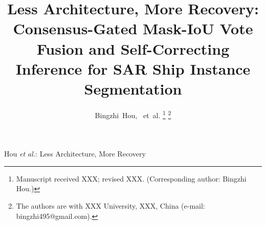 \documentclass[journal]{IEEEtran}
\begin{document}
\title{Less Architecture, More Recovery: Consensus-Gated Mask-IoU Vote Fusion and Self-Correcting Inference for SAR Ship Instance Segmentation}

\author{Bingzhi~Hou,~ et~al.%
\thanks{Manuscript received XXX; revised XXX. (Corresponding author: Bingzhi Hou.)}%
\thanks{The authors are with XXX University, XXX, China (e-mail: bingzhi495@gmail.com).}}

%
{Hou \MakeLowercase{\textit{et al.}}: Less Architecture, More Recovery}

\maketitle









\end{document}
